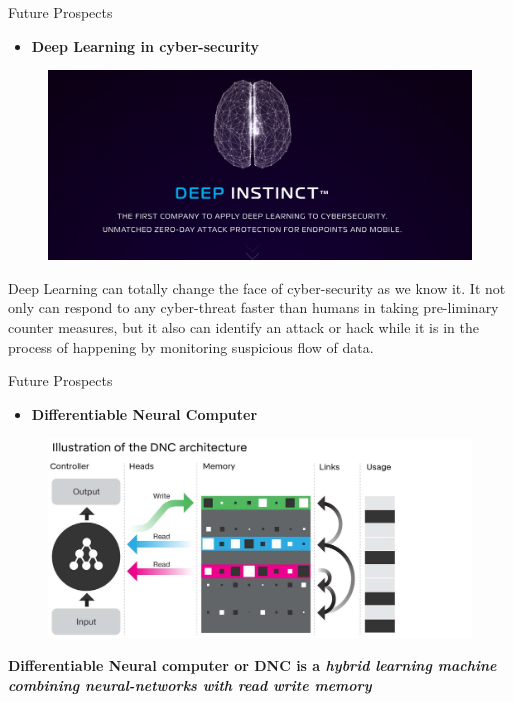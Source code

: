 \documentclass[10pt]{beamer}
\begin{document}
	\begin{frame}[c]{Future Prospects}
		\begin{itemize}
			\item \large{\textbf{Deep Learning in cyber-security}}
		\end{itemize}
		\begin{figure}
			\includegraphics[width=\linewidth]{images/cybersec}
		\end{figure}
		Deep Learning can totally change the face of cyber-security as we know it. It not only can respond to any cyber-threat faster than humans in taking pre-liminary counter measures, but it also can identify an attack or hack while it is in the process of happening by monitoring suspicious flow of data.
	\end{frame}
	\begin{frame}[c]{Future Prospects}
		\begin{itemize}
			\item \large{\textbf{Differentiable Neural Computer}}
		\end{itemize}
		\begin{figure}
			\includegraphics[width=\linewidth]{images/dnc}
		\end{figure}
		\textbf{Differentiable Neural computer or DNC is a \textit{hybrid learning machine \alert{combining neural-networks with read write memory}}}
	\end{frame}
\end{document}
